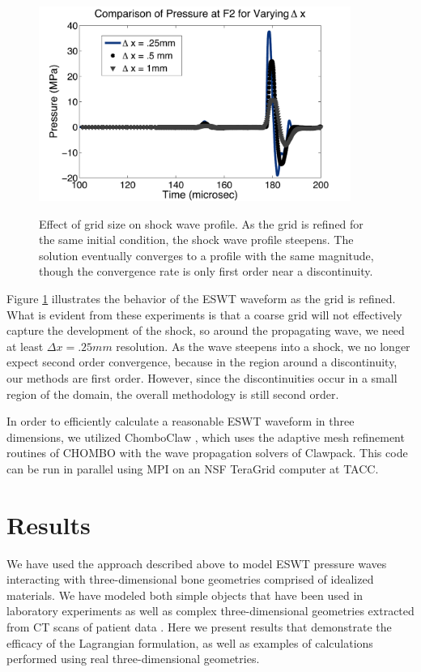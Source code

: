 \documentclass{article}
\begin{document}
\begin{figure}[h!]
\begin{center}
\includegraphics[height=2.5in]{variable_deltax_pressure.pdf}
\label{fig:steepening}
\caption{Effect of grid size on shock wave profile.  As the grid is refined for the same initial condition, the shock wave profile steepens. The solution eventually converges to a profile with the same magnitude, though the convergence rate is only first order near a discontinuity. }
\end{center}
\end{figure}
Figure \ref{fig:steepening} illustrates the behavior of the ESWT waveform as the grid is refined.  What is evident from these experiments is that a coarse grid will not effectively capture the development of the shock, so around the propagating wave, we need at least $\Delta x = .25mm$ resolution.  As the wave steepens into a shock, we no longer expect second order convergence, because in the region around a discontinuity, our methods are first order.  However, since the discontinuities occur in a small region of the domain, the overall methodology is still second order.  

In order to efficiently calculate a reasonable ESWT waveform in three dimensions, we utilized ChomboClaw 
\cite{chomboclaw}, which uses the adaptive mesh refinement routines of CHOMBO with the wave 
propagation solvers of Clawpack.  This code can be run in parallel using MPI on an NSF
TeraGrid computer at TACC.  

\section{Results}
\label{sec:results}
We have used the approach described above to model ESWT pressure waves interacting with three-dimensional bone 
geometries comprised of idealized materials.  We have modeled both simple objects 
that have been used in laboratory experiments \cite{amath_apl_nonunion}
as well as complex three-dimensional geometries
extracted from CT scans of patient data \cite{kfagnan_mchang_ho}.  Here we present 
results that demonstrate the efficacy of the Lagrangian formulation, as well as examples of calculations 
performed using real three-dimensional geometries.  
\end{document}

